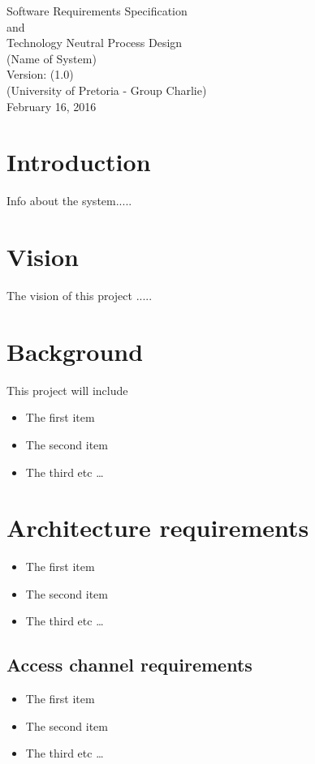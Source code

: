 \documentclass{article}
\begin{document}
	\begin{titlepage}
		\begin{center}
		\huge
		{Software Requirements Specification \\
		and\\
		Technology Neutral Process Design\\
		(Name of System)\\
		[2cm]
		Version: (1.0)\\
		(University of Pretoria - Group Charlie)
		\\
		February 16, 2016
		}
		
		\end{center}
	\end{titlepage}
	\newpage
	\tableofcontents
	\newpage
	\section{Introduction}
	Info about the system.....
	\section{Vision}
	The vision of this project .....
	\section{Background}
		This project will include 
		\begin{itemize}
		  \item The first item
		  \item The second item
		  \item The third etc \ldots
		\end{itemize}
		
	\section {Architecture requirements}
		\begin{itemize}
		  \item The first item
		  \item The second item
		  \item The third etc \ldots
		\end{itemize}
		
	\subsection {Access channel requirements}
		\begin{itemize}
		  \item The first item
		  \item The second item
		  \item The third etc \ldots
		\end{itemize}
		
\end{document}
